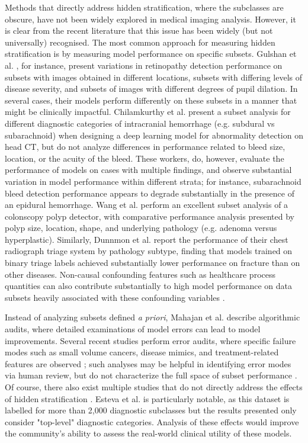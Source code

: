 \documentclass{article}
\begin{document}
Methods that directly address hidden stratification, where the subclasses are obscure, have not been widely explored in medical imaging analysis.  
However, it is clear from the recent literature that this issue has been widely (but not universally) recognised.  
The most common approach for measuring hidden stratification is by measuring model performance on specific subsets.
Gulshan et al. \citep{Gulshan2016-we}, for instance, present variations in retinopathy detection performance on subsets with images obtained in different locations, subsets with differing levels of disease severity, and subsets of images with different degrees of pupil dilation.  
In several cases, their models perform differently on these subsets in a manner that might be clinically impactful.  
Chilamkurthy et al. \citep{Chilamkurthy2018-op}  present a subset analysis for different diagnostic categories of intracranial hemorrhage (e.g. subdural vs subarachnoid) when designing a deep learning model for abnormality detection on head CT, but do not analyze differences in  performance related to bleed size, location, or the acuity of the bleed. 
 These workers, do, however, evaluate the performance of models on cases with multiple findings, and observe substantial variation in model performance within different strata; for instance, subarachnoid bleed detection performance appears to degrade substantially in the presence of an epidural hemorrhage.  
Wang et al. \citep{Wang2019-jr} perform an excellent subset analysis of a colonscopy polyp detector, with comparative performance analysis presented by polyp size, location, shape, and underlying pathology (e.g. adenoma versus hyperplastic).  
 Similarly, Dunnmon et al. \citep{Dunnmon2019-rr} report the performance of their chest radiograph triage system by pathology subtype, finding that models trained on binary triage labels achieved substantially lower performance on fracture than on other diseases.   
Non-causal confounding features such as healthcare process quantities can also contribute substantially to high model performance on data subsets heavily associated with these confounding variables \citep{Winkler2019-fw, Badgeley2019-zi, Agniel2018-qp, Zech2018-xq}.

Instead of analyzing subsets defined \textit{a priori}, Mahajan et al. \citep{Mahajan2019-yi} describe algorithmic audits, where detailed examinations of model errors can lead to model improvements.
 Several recent studies perform error audits, where specific failure modes such as small volume cancers, disease mimics, and treatment-related features are observed \citep{Campanella2019-qs, Wang2019-jr}; such analyses may be helpful in identifying error modes via human review, but do not characterize the full space of subset performance \citep{Selbst2017-gz}.  
 Of course, there also exist multiple studies that do not directly address the effects of hidden stratification \citep{Haenssle2018-vw, Bien2018-ae}. 
 Esteva et al. \citep{Esteva2017-if} is particularly notable, as this dataset is labelled for more than 2,000 diagnostic subclasses but the results presented only consider "top-level" diagnostic categories. 
 Analysis of these effects would improve the community's ability to assess the real-world clinical utility of these models. 
 
\end{document}
